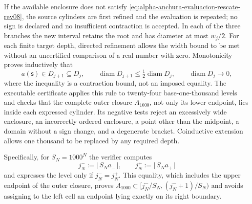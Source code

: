 If the available enclosure does not satisfy
\eqref{eq:alpha-anchura-evaluacion-rescate-rev08}, the source cylinders
are first refined and the evaluation is repeated; no sign is declared and no
insufficient contraction is accepted. In each of the three branches the new
interval retains the root and has diameter at most \(w_j/2\). For each
finite target depth, directed refinement allows the width
bound to be met without an uncertified comparison of a real number with zero.
Monotonicity proves inductively that
\begin{equation}
 a(\mathsf s)\in D_{j+1}\subseteq D_j,\qquad
 \operatorname{diam}D_{j+1}\leq
 \tfrac12\operatorname{diam}D_j,
 \qquad \operatorname{diam}D_j\longrightarrow0,
 \label{eq:alpha-biseccion-racional}
\end{equation}
where the inequality is a contraction bound, not an imposed equality.
The executable certificate applies
this rule to twenty-four base-one-thousand levels and checks that the complete
outer closure \(A_{1000}\), not only its lower endpoint, lies inside
each expressed cylinder. Its negative tests reject an excessively wide
enclosure, an incorrectly ordered enclosure, a point other than the midpoint, a domain without
a sign change, and a degenerate bracket. Coinductive extension allows
one thousand to be replaced by any required depth.

Specifically, for \(S_N=1000^N\) the verifier computes
\begin{equation}
 j_N^-:=\lfloor S_Na_-\rfloor,
 \qquad j_N^+:=\lfloor S_Na_+\rfloor
 \label{eq:alpha-indices-cilindro-dirigidos-rev08}
\end{equation}
and expresses the level only if \(j_N^-=j_N^+\). This equality, which includes the
upper endpoint of the outer closure, proves
\(A_{1000}\subset[j_N^-/S_N,(j_N^-+1)/S_N)\) and avoids assigning to the left
cell an endpoint lying exactly on its right boundary.

